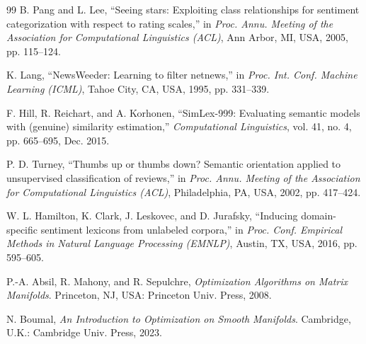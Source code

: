 \documentclass[journal]{IEEEtran}
\begin{document}
\begin{thebibliography}{99}
B. Pang and L. Lee, ``Seeing stars: Exploiting class relationships for sentiment categorization with respect to rating scales,'' in \emph{Proc. Annu. Meeting of the Association for Computational Linguistics (ACL)}, Ann Arbor, MI, USA, 2005, pp. 115--124.

K. Lang, ``NewsWeeder: Learning to filter netnews,'' in \emph{Proc. Int. Conf. Machine Learning (ICML)}, Tahoe City, CA, USA, 1995, pp. 331--339.

F. Hill, R. Reichart, and A. Korhonen, ``SimLex-999: Evaluating semantic models with (genuine) similarity estimation,'' \emph{Computational Linguistics}, vol. 41, no. 4, pp. 665--695, Dec. 2015.

P. D. Turney, ``Thumbs up or thumbs down? Semantic orientation applied to unsupervised classification of reviews,'' in \emph{Proc. Annu. Meeting of the Association for Computational Linguistics (ACL)}, Philadelphia, PA, USA, 2002, pp. 417--424.

W. L. Hamilton, K. Clark, J. Leskovec, and D. Jurafsky, ``Inducing domain-specific sentiment lexicons from unlabeled corpora,'' in \emph{Proc. Conf. Empirical Methods in Natural Language Processing (EMNLP)}, Austin, TX, USA, 2016, pp. 595--605.

P.-A. Absil, R. Mahony, and R. Sepulchre, \emph{Optimization Algorithms on Matrix Manifolds}. Princeton, NJ, USA: Princeton Univ. Press, 2008.

N. Boumal, \emph{An Introduction to Optimization on Smooth Manifolds}. Cambridge, U.K.: Cambridge Univ. Press, 2023.

\end{thebibliography}
\end{document}
